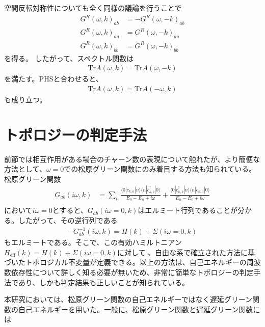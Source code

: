 \documentclass[12pt]{jsbook}
\newcommand{\la}{\langle}
\newcommand{\ra}{\rangle}
\newcommand{\ca}{c_{k,a}}
\newcommand{\cbd}{c_{k,b}^{\dagger}}
\begin{document}
空間反転対称性についても全く同様の議論を行うことで
\begin{align}
G^R(\omega,k)_{ab}&=-G^R(\omega,-k)_{ab}\\
G^R(\omega,k)_{aa}&=G^R(\omega,-k)_{aa}\\
G^R(\omega,k)_{bb}&=G^R(\omega,-k)_{bb}
\end{align}  を得る。 したがって、スペクトル関数は 
\begin{eqnarray}
    \mathrm{Tr}A(\omega,k)=\mathrm{Tr}A(\omega,-k)
\end{eqnarray} 
を満たす。PHSと合わせると、 
\begin{eqnarray}
    \mathrm{Tr}A(\omega,k)=\mathrm{Tr}A(-\omega,k)
\end{eqnarray}
も成り立つ。
\section{トポロジーの判定手法}%
前節では相互作用がある場合のチャーン数の表現について触れたが、より簡便な方法として、$\omega=0$での松原グリーン関数にのみ着目する方法も知られている\cite{PhysRevX.2.031008,article}。松原グリーン関数
\begin{eqnarray}
     G_{ab}(i\omega,k) &= \displaystyle \sum_n \frac{\la 0|\ca |n\ra \la n| \cbd | 0\ra}{E_0-E_n + i\omega  } + \frac{\la 0|\cbd |n\ra \la n| \ca |0\ra}{E_n - E_0 + i\omega}\\
\end{eqnarray}
において$i\omega=0$とすると、$G_{ab}(i\omega=0,k)$はエルミート行列であることが分かる。したがって、その逆行列である
\begin{eqnarray}
    -G^{-1}_{ab}(i\omega,k)=H(k) + \Sigma(i\omega=0,k)
\end{eqnarray}
もエルミートである。そこで、この有効ハミルトニアン$H_{\mathrm{eff}}(k) = H(k) + \Sigma(i\omega=0,k)$に対して
、自由な系で確立された方法に基づいたトポロジカル不変量が定義できる。以上の方法は、自己エネルギーの周波数依存性について詳しく知る必要が無いため、非常に簡単なトポロジーの判定手法であり、しかも判定結果も正しいことが知られている。

本研究においては、松原グリーン関数の自己エネルギーではなく遅延グリーン関数の自己エネルギーを用いた。一般に、松原グリーン関数と遅延グリーン関数には
\end{document}
